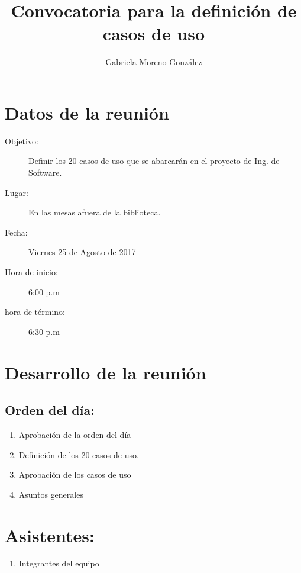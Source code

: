 \documentclass[12pt]{article}
\title{Convocatoria para la definición de casos de uso}
\author{Gabriela Moreno González}
\begin{document}
\maketitle
\tableofcontents

\section{Datos de la reunión}
\begin{description}
	\item[Objetivo:] Definir los 20 casos de uso que se abarcarán en el proyecto de Ing. de Software.
	\item[Lugar:] En las mesas afuera de la biblioteca.
	\item[Fecha:] Viernes 25 de Agosto de 2017
	\item[Hora de inicio:] 6:00 p.m
	\item[hora de término:] 6:30 p.m
\end{description}

\section{Desarrollo de la reunión}

\subsection{Orden del día:}
\begin{enumerate}
 	\item Aprobación de la orden del día
	\item Definición de los 20 casos de uso.
	\item Aprobación de los casos de uso
	\item Asuntos generales
\end{enumerate}

\section{Asistentes:}
\begin{enumerate}
 	 \item  Integrantes del equipo
\end{enumerate}
\end{document}
